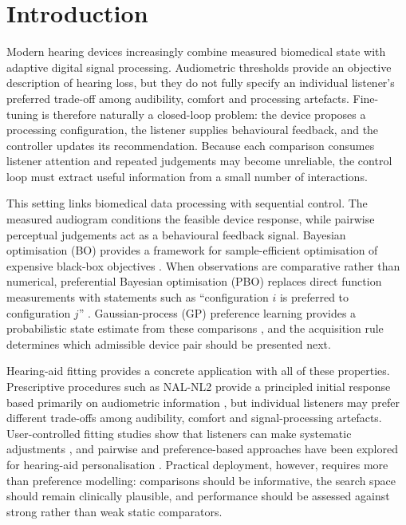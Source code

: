 \documentclass[preprint,12pt]{elsarticle}
\begin{document}
\section{Introduction}
\label{sec:introduction}

Modern hearing devices increasingly combine measured biomedical state with adaptive digital signal processing. Audiometric thresholds provide an objective description of hearing loss, but they do not fully specify an individual listener's preferred trade-off among audibility, comfort and processing artefacts. Fine-tuning is therefore naturally a closed-loop problem: the device proposes a processing configuration, the listener supplies behavioural feedback, and the controller updates its recommendation. Because each comparison consumes listener attention and repeated judgements may become unreliable, the control loop must extract useful information from a small number of interactions.

This setting links biomedical data processing with sequential control. The measured audiogram conditions the feasible device response, while pairwise perceptual judgements act as a behavioural feedback signal. Bayesian optimisation (BO) provides a framework for sample-efficient optimisation of expensive black-box objectives \cite{shahriari2016}. When observations are comparative rather than numerical, preferential Bayesian optimisation (PBO) replaces direct function measurements with statements such as ``configuration $i$ is preferred to configuration $j$'' \cite{gonzalez2017}. Gaussian-process (GP) preference learning provides a probabilistic state estimate from these comparisons \cite{chu2005,rasmussen2006}, and the acquisition rule determines which admissible device pair should be presented next.

Hearing-aid fitting provides a concrete application with all of these properties. Prescriptive procedures such as NAL-NL2 provide a principled initial response based primarily on audiometric information \cite{keidser2011}, but individual listeners may prefer different trade-offs among audibility, comfort and signal-processing artefacts. User-controlled fitting studies show that listeners can make systematic adjustments \cite{dreschler2008,boothroyd2017,mackersie2019,sabin2020}, and pairwise and preference-based approaches have been explored for hearing-aid personalisation \cite{birlutiu2010,nielsen2015,vyas2022,akbarzadeh2022,ni2024}. Practical deployment, however, requires more than preference modelling: comparisons should be informative, the search space should remain clinically plausible, and performance should be assessed against strong rather than weak static comparators.
\end{document}

